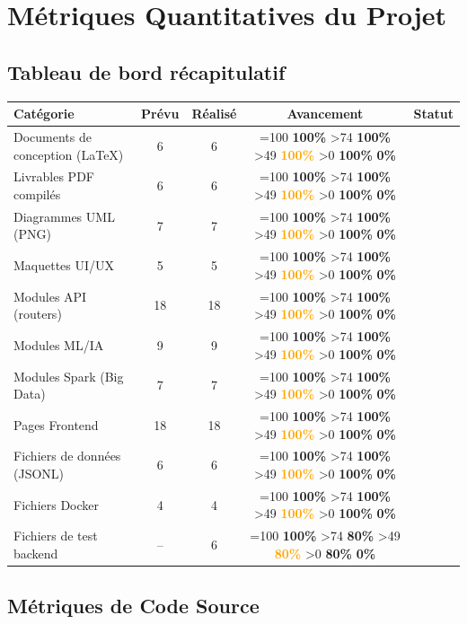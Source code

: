 \documentclass[12pt,a4paper]{article}
\newcommand{\cmark}{\textcolor{vert}{\ding{51}}}
\newcommand{\wmark}{\textcolor{orange}{\ding{115}}}
\newcommand{\statut}[1]{%
  \ifnum#1=100 \cellcolor{vertclair}\textbf{\textcolor{vert}{100\%}}%
  \else\ifnum#1>74 \cellcolor{vertclair}\textbf{\textcolor{vert}{#1\%}}%
  \else\ifnum#1>49 \cellcolor{orangeclair}\textbf{\textcolor{orange}{#1\%}}%
  \else\ifnum#1>0 \cellcolor{rougeclair}\textbf{\textcolor{rouge}{#1\%}}%
  \else \cellcolor{rougeclair}\textbf{\textcolor{rouge}{0\%}}%
  \fi\fi\fi\fi%
}
\begin{document}
\section{Métriques Quantitatives du Projet}

\subsection{Tableau de bord récapitulatif}

\begin{center}
\renewcommand{\arraystretch}{1.5}
\begin{tabular}{|l|c|c|c|c|}
\hline
\rowcolor{bleu!15}
\textbf{Catégorie} & \textbf{Prévu} & \textbf{Réalisé} & \textbf{Avancement} & \textbf{Statut} \\
\hline
Documents de conception (LaTeX) & 6 & 6 & \statut{100} & \cmark \\
\hline
Livrables PDF compilés & 6 & 6 & \statut{100} & \cmark \\
\hline
Diagrammes UML (PNG) & 7 & 7 & \statut{100} & \cmark \\
\hline
Maquettes UI/UX & 5 & 5 & \statut{100} & \cmark \\
\hline
Modules API (routers) & 18 & 18 & \statut{100} & \cmark \\
\hline
Modules ML/IA & 9 & 9 & \statut{100} & \cmark \\
\hline
Modules Spark (Big Data) & 7 & 7 & \statut{100} & \cmark \\
\hline
Pages Frontend & 18 & 18 & \statut{100} & \cmark \\
\hline
Fichiers de données (JSONL) & 6 & 6 & \statut{100} & \cmark \\
\hline
Fichiers Docker & 4 & 4 & \statut{100} & \cmark \\
\hline
Fichiers de test backend & -- & 6 & \statut{80} & \wmark \\
\hline
\end{tabular}
\end{center}

\subsection{Métriques de Code Source}
\end{document}
